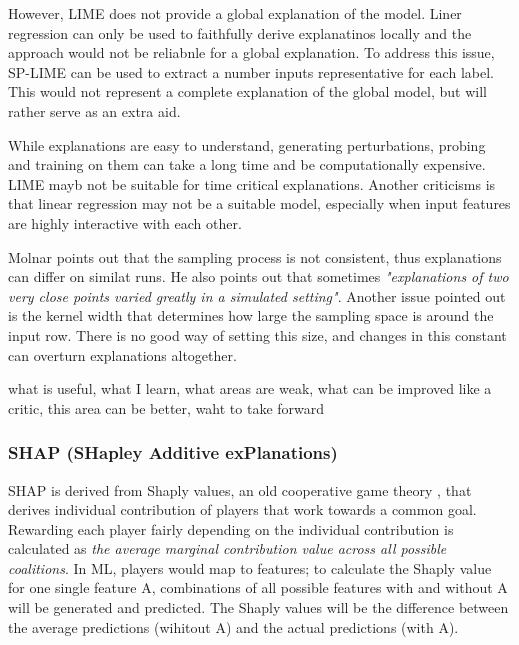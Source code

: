 \documentclass[proposal]{softeng}
\begin{document}
However, LIME does not provide a global explanation of the model. Liner regression can only be used to faithfully derive explanatinos locally and the approach would not be reliabnle for a global explanation. To address this issue, SP-LIME can be used to extract a number inputs representative for each label. This would not represent a complete explanation of the global model, but will rather serve as an extra aid.

While explanations are easy to understand, generating perturbations, probing and training on them can take a long time and be computationally expensive. LIME mayb not be suitable for time critical explanations. Another criticisms is that linear regression may not be a suitable model, especially when input features are highly interactive with each other.

Molnar \cite{molnar2019} points out that the sampling process is not consistent, thus explanations can differ on similat runs. He also points out that sometimes \textit{"explanations of two very close points varied greatly in a simulated setting"}. Another issue pointed out is the kernel width that determines how large the sampling space is around the input row. There is no good way of setting this size, and changes in this constant can overturn explanations altogether.


what is useful, what I learn, what areas are weak, what can be improved 
like a critic, this area can be better, waht to take forward

\subsubsection{SHAP (SHapley Additive exPlanations)}
SHAP\cite{LundbergScott2017AUAt} is derived from Shaply values, an old cooperative game theory \cite{shapley-value}, that derives individual contribution of players that work towards a common goal. Rewarding each player fairly depending on the individual contribution is calculated as \textit{the average marginal contribution value across all possible coalitions}\cite{molnar2019}. In ML, players would map to features; to calculate the Shaply value for one single feature A, combinations of all possible features with and without A will be generated and predicted. The Shaply values will be the difference between the average predictions (wihitout A) and the  actual predictions (with A). 
\end{document}
